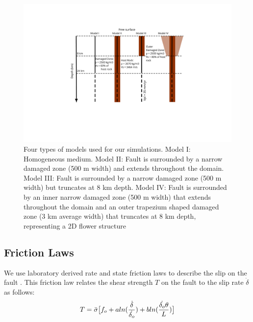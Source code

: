 \documentclass[11pt]{article}
\begin{document}
\begin{figure}[!htb]
    \centering
    \label{fig2}
    \includegraphics[scale=0.3]{2.pdf}
    \caption{Four types of models used for our simulations. Model I: Homogeneous medium. Model II: Fault is surrounded by a narrow damaged zone (500 m width) and extends throughout the domain. Model III: Fault is surrounded by a narrow damaged zone (500 m width) but truncates at 8 km depth. Model IV: Fault is surrounded by an inner narrow damaged zone (500 m width) that extends throughout the domain and an outer trapezium shaped damaged zone (3 km average width) that truncates at 8 km depth, representing a 2D flower structure}
\end{figure}

\subsection{Friction Laws}
We use laboratory derived rate and state friction laws to describe the slip on the fault \citep{dieterich_1979, ruina_1983, scholz_1998}. This friction law relates the shear strength $T$ on the fault to the slip rate $\dot{\delta}$ as follows:
\begin{align}
    \centering
    T = \bar{\sigma}\big[f_o + aln(\frac{\dot{\delta}}{\dot{\delta_o}}) + bln(\frac{\dot{\delta_o}\theta}{L}) \big]
    \label{rsf}
\end{align}
\end{document}
